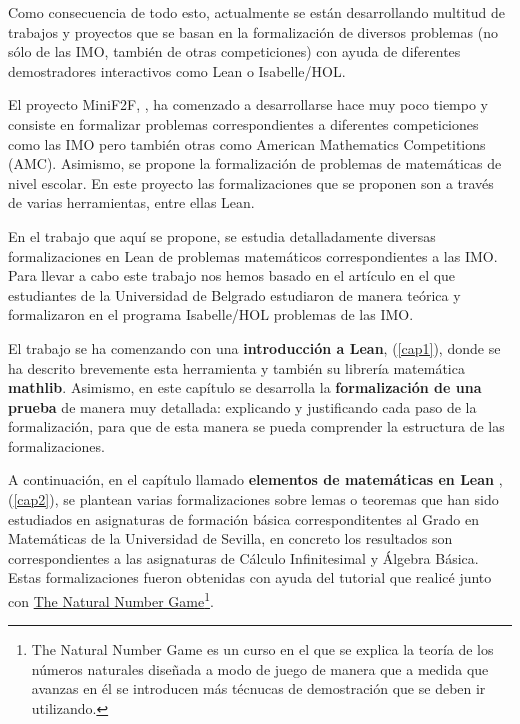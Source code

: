Como consecuencia de todo esto, actualmente se están desarrollando multitud de
trabajos y proyectos que se basan en la formalización de diversos problemas (no
sólo de las IMO, también de otras competiciones) con ayuda de diferentes
demostradores interactivos como Lean o Isabelle/HOL.

El proyecto MiniF2F, \cite{mini}, ha comenzado a desarrollarse hace muy poco
tiempo y consiste en formalizar problemas correspondientes a diferentes
competiciones como las IMO pero también otras como American Mathematics
Competitions (AMC). Asimismo, se propone la formalización de problemas de
matemáticas de nivel escolar. En este proyecto las formalizaciones que se
proponen son a través de varias herramientas, entre ellas Lean.

En el trabajo que aquí se propone, se estudia detalladamente diversas
formalizaciones en Lean de problemas matemáticos correspondientes a las IMO.
Para llevar a cabo este trabajo nos hemos basado en el artículo \cite{ART} en
el que estudiantes de la Universidad de Belgrado estudiaron de manera teórica y
formalizaron en el programa Isabelle/HOL problemas de las IMO.

El trabajo se ha comenzando con una \textbf{introducción a Lean}, (\ref{cap1}),
donde se ha descrito brevemente esta herramienta y también su librería
matemática \textbf{mathlib}. Asimismo, en este capítulo se desarrolla la
\textbf{formalización de una prueba} de manera muy detallada: explicando y
justificando cada paso de la formalización, para que de esta manera se pueda
comprender la estructura de las formalizaciones.

A continuación, en el capítulo llamado \textbf{elementos de matemáticas en Lean}
, (\ref{cap2}), se plantean varias formalizaciones sobre lemas o teoremas que
han sido estudiados en asignaturas de formación básica corresponditentes al
Grado en Matemáticas de la Universidad de Sevilla, en concreto los resultados
son correspondientes a las asignaturas de Cálculo Infinitesimal y Álgebra
Básica. Estas formalizaciones fueron obtenidas con ayuda del tutorial
\cite{tutor} que realicé junto con
\href{https://www.ma.imperial.ac.uk/~buzzard/xena/natural_number_game/}{The Natural Number Game}\footnote{The Natural Number Game es un curso en el que se
  explica la teoría de los números naturales diseñada a modo de juego de manera
  que a medida que avanzas en él se introducen más técnucas de demostración que
  se deben ir utilizando.}.

